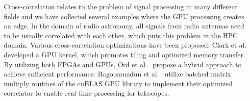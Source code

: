






Cross-correlation relates to the problem of signal processing in many different fields and we have collected several examples where the GPU processing creates an edge. In the domain of radio astronomy, all signals from radio antennas need to be usually correlated with each other, which puts this problem in the HPC domain. Various cross-correlation optimizations have been proposed: Clark et al.~\cite{Clark2011} developed a GPU kernel, which promotes tiling and optimized memory transfer. By utilizing both FPGAs and GPUs, Ord et al.~\cite{ord2015murchison} propose a hybrid approach to achieve sufficient performance. Ragoomundun et al.~\cite{ragoomundun2020cublas} utilize batched matrix multiply routines of the cuBLAS GPU library to implement their optimized correlator to enable real-time processing for telescopes.

